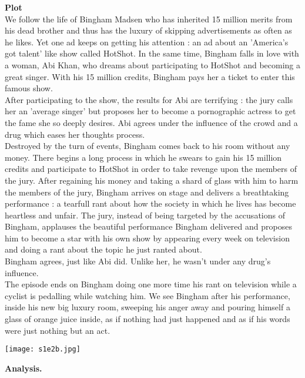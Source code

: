 \documentclass{article}
\begin{document}
\textbf{Plot}\\
We follow the life of Bingham Madsen who  has inherited 15 million merits from his dead brother and thus has the luxury of skipping advertisements as often as he likes. Yet one ad keeps on getting his attention : an ad about an 'America's got talent' like show called HotShot. In the same time, Bingham falls in love with a woman, Abi Khan, who dreams about participating to HotShot and becoming a great singer. With his 15 million credits, Bingham pays her a ticket to enter this famous show.\\
After participating to the show, the results for Abi are terrifying : the jury calls her an 'average singer' but proposes her to become a pornographic actress to get the fame she so deeply desires. Abi agrees under the influence of the crowd and a drug which eases her thoughts process.\\
Destroyed by the turn of events, Bingham comes back to his room without any money. There begins a long process in which he swears to gain his 15 million credits and participate to HotShot in order to take revenge upon the members of the jury. After regaining his money and taking a shard of glass with him to harm the members of the jury, Bingham arrives on stage and delivers a breathtaking performance : a tearfull rant about how the society in which he lives has become heartless and unfair. The jury, instead of being targeted by the accusations of Bingham, applauses the beautiful performance Bingham delivered and proposes him to become a star with his own show by appearing every week on television and doing a rant about the topic he just ranted about.\\
Bingham agrees, just like Abi did. Unlike her, he wasn't under any drug's influence. \\
The episode ends on Bingham doing one more time his rant on television while a cyclist is pedalling while watching him. We see Bingham after his performance, inside his new big luxury room, sweeping his anger away and pouring himself a glass of orange juice inside, as if nothing had just happened and as if his words were just nothing but an act.

\begin{center}
\texttt{[image: s1e2b.jpg]}
\end{center}

\textbf{Analysis.}
\end{document}
